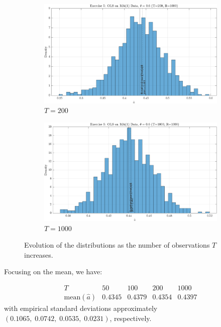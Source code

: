 \documentclass[dvipsnames,11pt]{article}
\begin{document}
\begin{solution}
\begin{figure}[h]
\begin{subfigure}[b]{0.49\textwidth}
                         \includegraphics[width=\textwidth, trim=0cm 0cm 0cm 0.55cm, clip]{output/ex5_hist_T200.png}
                         \caption{\(T=200\)}
                         \label{fig:ex5_hist_T200}
                     \end{subfigure}
                     \hfill
                     \begin{subfigure}[b]{0.49\textwidth}
                         \centering
                         \includegraphics[width=\textwidth, trim=0cm 0cm 0cm 0.55cm, clip]{output/ex5_hist_T1000.png}
                         \caption{\(T=1000\)}
                         \label{fig:ex5_hist_T1000}
                     \end{subfigure}
                    \label{fig:ex_5}
                    \caption{Evolution of the distributions as the number of observations \(T\) increases.}
                \end{figure}

\newpage

        Focusing on the mean, we have:

        \[
        \begin{array}{r|cccc}
        T & 50 & 100 & 200 & 1000\\\hline
        \mathrm{mean}(\hat a) & 0.4345 & 0.4379 & 0.4354 & 0.4397
        \end{array}
        \]
        with empirical standard deviations approximately $(0.1065,\;0.0742,\;0.0535,\;0.0231)$, respectively.


\end{solution}
\end{document}
